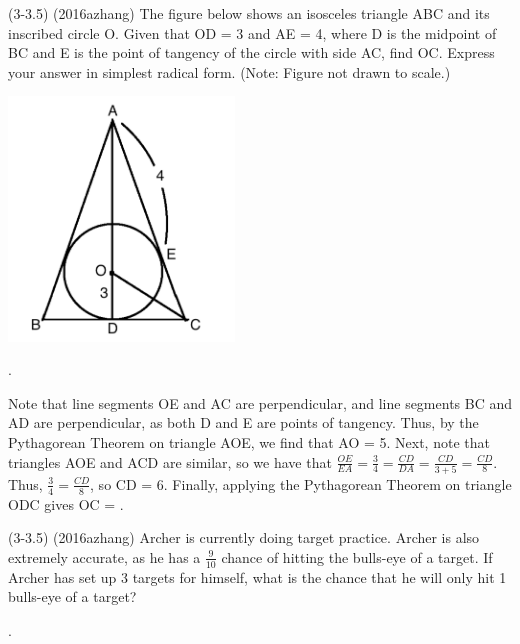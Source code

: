 \documentclass[11pt]{article}
\begin{document}
\begin{problem}
(3-3.5) (2016azhang) The figure below shows an isosceles triangle ABC and its inscribed circle O. Given that OD = 3 and AE = 4, where D is the midpoint of BC and E is the point of tangency of the circle with side AC, find OC. Express your answer in simplest radical form. (Note: Figure not drawn to scale.)
\begin{center}
\includegraphics[width=6cm]{triangle.png}
\end{center}
\end{problem}

\begin{answer}
.
\end{answer}

\begin{solution}
Note that line segments OE and AC are perpendicular, and line segments BC and AD are perpendicular, as both D and E are points of tangency. Thus, by the Pythagorean Theorem on triangle AOE, we find that AO = 5. Next, note that triangles AOE and ACD are similar, so we have that $\frac{OE}{EA} = \frac{3}{4} = \frac{CD}{DA} = \frac{CD}{3+5} = \frac{CD}{8}$. Thus, $\frac{3}{4} = \frac{CD}{8}$, so CD = 6. Finally, applying the Pythagorean Theorem on triangle ODC gives OC = .
\end{solution}

\begin{problem}
(3-3.5) (2016azhang) Archer is currently doing target practice. Archer is also extremely accurate, as he has a $\frac{9}{10}$ chance of hitting the bulls-eye of a target. If Archer has set up 3 targets for himself, what is the chance that he will only hit 1 bulls-eye of a target?
\end{problem}

\begin{answer}
.
\end{answer}
\end{document}
